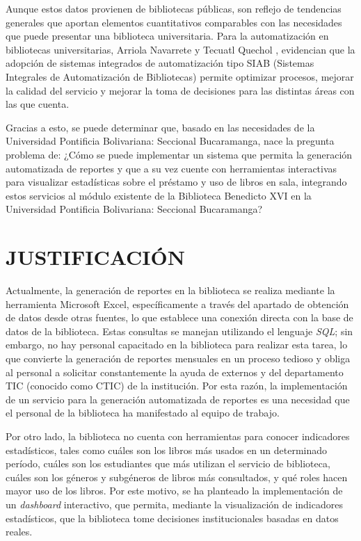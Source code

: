 \documentclass[spanish]{ieee_upb}
\begin{document}
\vspace{0.3cm}
Aunque estos datos provienen de bibliotecas públicas, son reflejo de tendencias generales que aportan elementos cuantitativos comparables con las necesidades que puede presentar una biblioteca universitaria. Para la automatización en bibliotecas universitarias, Arriola Navarrete y Tecuatl Quechol \cite{Arriola2011}, evidencian que la adopción de sistemas integrados de automatización tipo SIAB (Sistemas Integrales de Automatización de Bibliotecas) permite optimizar procesos, mejorar la calidad del servicio y mejorar la toma de decisiones para las distintas áreas con las que cuenta.

\vspace{0.3cm}
Gracias a esto, se puede determinar que, basado en las necesidades de la Universidad Pontificia Bolivariana: Seccional Bucaramanga, nace la pregunta problema de: ¿Cómo se puede implementar un sistema que permita la generación automatizada de reportes y que a su vez cuente con herramientas interactivas para visualizar estadísticas sobre el préstamo y uso de libros en sala, integrando estos servicios al módulo existente de la Biblioteca Benedicto XVI en la Universidad Pontificia Bolivariana: Seccional Bucaramanga?

\newpage
\section{JUSTIFICACIÓN}
Actualmente, la generación de reportes en la biblioteca se realiza mediante la herramienta Microsoft Excel, específicamente a través del apartado de obtención de datos desde otras fuentes, lo que establece una conexión directa con la base de datos de la biblioteca. Estas consultas se manejan utilizando el lenguaje \textit{SQL}; sin embargo, no hay personal capacitado en la biblioteca para realizar esta tarea, lo que convierte la generación de reportes mensuales en un proceso tedioso y obliga al personal a solicitar constantemente la ayuda de externos y del departamento TIC (conocido como CTIC) de la institución. Por esta razón, la implementación de un servicio para la generación automatizada de reportes es una necesidad que el personal de la biblioteca ha manifestado al equipo de trabajo.

Por otro lado, la biblioteca no cuenta con herramientas para conocer indicadores estadísticos, tales como cuáles son los libros más usados en un determinado período, cuáles son los estudiantes que más utilizan el servicio de biblioteca, cuáles son los géneros y subgéneros de libros más consultados, y qué roles hacen mayor uso de los libros. Por este motivo, se ha planteado la implementación de un \textit{dashboard} interactivo, que permita, mediante la visualización de indicadores estadísticos, que la biblioteca tome decisiones institucionales basadas en datos reales.
\end{document}
